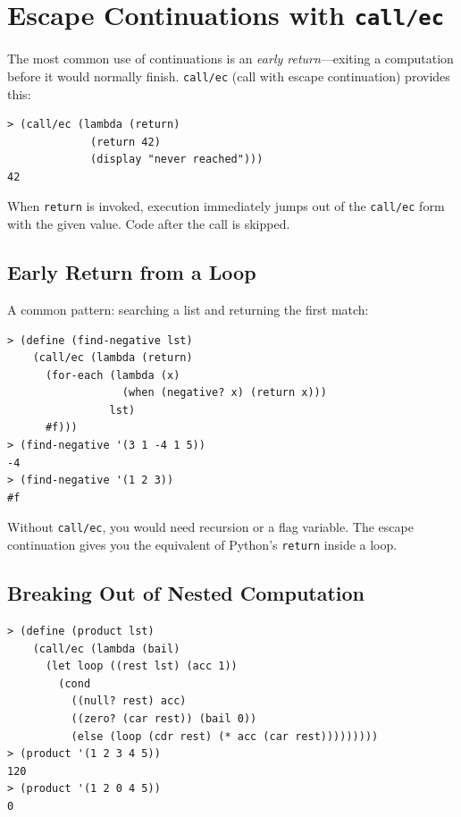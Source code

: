 \section{Escape Continuations with \texttt{call/ec}}

The most common use of continuations is an \emph{early return}---exiting a computation before it would normally finish. \texttt{call/ec} (call with escape continuation) provides this:

\begin{lstlisting}[style=repl]
> (call/ec (lambda (return)
             (return 42)
             (display "never reached")))
42
\end{lstlisting}

When \texttt{return} is invoked, execution immediately jumps out of the \texttt{call/ec} form with the given value. Code after the call is skipped.

\subsection{Early Return from a Loop}

A common pattern: searching a list and returning the first match:

\begin{lstlisting}[style=repl]
> (define (find-negative lst)
    (call/ec (lambda (return)
      (for-each (lambda (x)
                  (when (negative? x) (return x)))
                lst)
      #f)))
> (find-negative '(3 1 -4 1 5))
-4
> (find-negative '(1 2 3))
#f
\end{lstlisting}

Without \texttt{call/ec}, you would need recursion or a flag variable. The escape continuation gives you the equivalent of Python's \texttt{return} inside a loop.

\subsection{Breaking Out of Nested Computation}

\begin{lstlisting}[style=repl]
> (define (product lst)
    (call/ec (lambda (bail)
      (let loop ((rest lst) (acc 1))
        (cond
          ((null? rest) acc)
          ((zero? (car rest)) (bail 0))
          (else (loop (cdr rest) (* acc (car rest)))))))))
> (product '(1 2 3 4 5))
120
> (product '(1 2 0 4 5))
0
\end{lstlisting}

